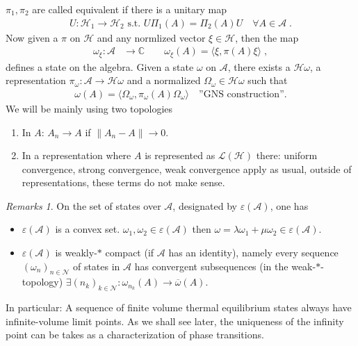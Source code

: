 \documentclass[
a4paper, %
11pt, %
onecolumn, %
openany, %
]{memoir}
\theoremstyle{definition}
\theoremstyle{remark}
\newtheorem{remarks}{Remarks}[chapter]
\theoremstyle{plain}
\begin{document}
$\pi_1,\pi_2$ are called equivalent if there is a unitary map \begin{align}
U:\mathcal{H}_1\rightarrow \mathcal{H}_2 \text{ s.t. } U\Pi_1(A)=\Pi_2(A)U\quad \forall A\in \mathcal{A}\; .
\end{align}
Now given a $\pi$ on $\mathcal{H}$ and any normlized vector $\xi\in\mathcal{H}$, then the map \begin{align}
\omega_{\xi}:\mathcal{A}&\longrightarrow \mathbb{C}\qquad \omega_{\xi}(A)=\langle\xi,\pi(A)\xi\rangle \; ,
\end{align}
defines a state on the algebra. Given a state $\omega$ on $\mathcal{A}$, there exists a $\mathcal{H}\omega$, a representation $\pi_{\omega}:\mathcal{A}\rightarrow \mathcal{H}\omega$ and a normalized $\Omega_{\omega}\in\mathcal{H}\omega$ such that \begin{align}
\omega(A)=\langle\Omega_{\omega},\pi_{\omega}(A)\Omega_{\omega}\rangle \quad \text{''GNS construction''.}
\end{align}
We will be mainly using two topologies \begin{enumerate}
	\item In $A$: $A_n\rightarrow A$ if $\|A_n-A\|\rightarrow 0$. 
	\item In a representation where $A$ is represented as $\mathcal{L}(\mathcal{H})$ there: uniform convergence, strong convergence, weak convergence apply as usual, outside of representations, these terms do not make sense.
\end{enumerate}
\begin{remarks}
	On the set of states over $\mathcal{A}$, designated by $\varepsilon(\mathcal{A})$, one has \begin{itemize}
		\item $\varepsilon(\mathcal{A})$ is a convex set. $\omega_1,\omega_2\in\varepsilon(\mathcal{A})$ then $\omega=\lambda\omega_1+\mu\omega_2\in\varepsilon(\mathcal{A})$.
		\item $\varepsilon(\mathcal{A})$ is weakly-$*$ compact (if $\mathcal{A}$ has an identity), namely every sequence $(\omega_n)_{n\in\mathcal{N}}$ of states in $\mathcal{A}$ has convergent subsequences (in the weak-$*$-topology) $\exists(n_k)_{k\in\mathcal{N}}:\omega_{n_k}(A)\rightarrow \overline{\omega}(A)$.
	\end{itemize}
In particular: A sequence of finite volume thermal equilibrium states always have infinite-volume limit points. As we shall see later, the uniqueness of the infinity point can be takes as a characterization of phase transitions.
\end{remarks}
\end{document}

